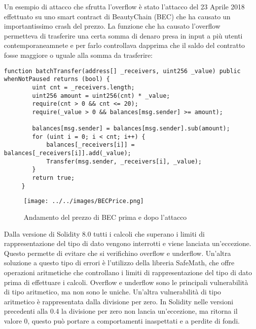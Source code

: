 \documentclass[../../Thesis.tex]{subfiles}
\begin{document}
Un esempio di attacco che sfrutta l'overflow è stato l'attacco del 23 Aprile 2018 effettuato su uno smart contract di BeautyChain (BEC) che ha causato un importantissimo crash del prezzo. La funzione che ha causato l'overflow permetteva di trasferire una certa somma di denaro presa in input a più utenti contemporaneamnete e per farlo controllava dapprima che il saldo del contratto fosse maggiore o uguale alla somma da trasferire:
\begin{lstlisting}[language=Solidity]
    function batchTransfer(address[] _receivers, uint256 _value) public whenNotPaused returns (bool) {
        uint cnt = _receivers.length;
        uint256 amount = uint256(cnt) * _value;
        require(cnt > 0 && cnt <= 20);
        require(_value > 0 && balances[msg.sender] >= amount);
    
        balances[msg.sender] = balances[msg.sender].sub(amount);
        for (uint i = 0; i < cnt; i++) {
            balances[_receivers[i]] = balances[_receivers[i]].add(_value);
            Transfer(msg.sender, _receivers[i], _value);
        }
        return true;
     }
\end{lstlisting}
\begin{figure}[H]
    \centering
    \texttt{[image: ../../images/BECPrice.png]}
    \caption{Andamento del prezzo di BEC prima e dopo  l'attacco}
    \label{fig:BECPrice}
\end{figure}
Dalla versione di Solidity 8.0  tutti i calcoli che superano i limiti di rappresentazione del tipo di dato vengono interrotti e viene lanciata un'eccezione. Questo permette di evitare che si verifichino overflow e underflow. Un'altra soluzione a questo tipo di errori è l'utilizzo della libreria SafeMath, che offre operazioni aritmetiche che controllano i limiti di rappresentazione del tipo di dato prima di effettuare i calcoli. Overflow e underflow sono le principali vulnerabilità di tipo aritmetico, ma non sono le uniche. Un'altra vulnerabilità di tipo aritmetico è rappresentata dalla divisione per zero. In Solidity nelle versioni precedenti alla 0.4 la divisione per zero non lancia un'eccezione, ma ritorna il valore 0, questo può portare a comportamenti inaspettati e a perdite di fondi.
\end{document}
